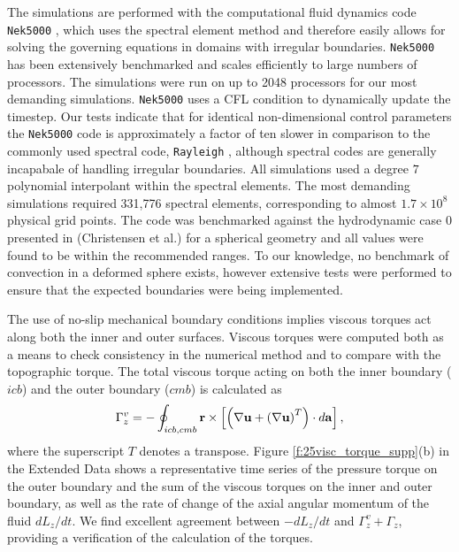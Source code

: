 The simulations are performed with the computational fluid dynamics code \texttt{Nek5000} \citep{nek5000}, which uses the spectral element method \citep{aP84} and therefore easily allows for solving the governing equations in domains with irregular boundaries. 
\texttt{Nek5000} has been extensively benchmarked and scales efficiently to large numbers of processors. 
The simulations were run on up to 2048 processors for our most demanding simulations. \texttt{Nek5000} uses a CFL condition to dynamically update the timestep. Our tests indicate that for identical non-dimensional control parameters the \texttt{Nek5000} code is approximately a factor of ten slower in comparison to the commonly used spectral code, \texttt{Rayleigh} \citep{hM16}, although spectral codes are generally incapabale of handling irregular boundaries.
All simulations used a degree $7$ polynomial interpolant within the spectral elements.
The most demanding simulations required 331,776 spectral elements, corresponding to almost $1.7\times10^8$ physical grid points. 
\textcolor{\revtxt}{The code was benchmarked against the hydrodynamic case 0 presented in (Christensen et al.) \citep{uC01} for a spherical geometry and all values were found to be within the recommended ranges. 
To our knowledge, no benchmark of convection in a deformed sphere exists, however extensive tests were performed to ensure that the expected boundaries were being implemented.}

\textcolor{\revtxt}{
The use of no-slip mechanical boundary conditions implies viscous torques act along both the inner and outer surfaces. Viscous torques were computed both as a means to check consistency in the numerical method and to compare with the topographic torque.
	The total viscous torque acting on both the inner boundary ($icb$) and the outer boundary ($cmb$) is calculated as
	\begin{equation}
	\Gamma_{z}^{v} = -\oint_{icb,cmb} \mathbf{r} \times \left[ \left (\nabla \mathbf{u} +\left (\nabla\mathbf{u}\right )^{T}\right ) \cdot d\mathbf{a}\right] ,
		\label{e:25vtq}
	\end{equation}
	where the superscript $T$ denotes a transpose. Figure \ref{f:25visc_torque_supp}(b) in the Extended Data shows a representative time series of the pressure torque on the outer boundary and the sum of the viscous torques on the inner and outer boundary, as well as the rate of change of the axial angular momentum of the fluid $dL_z/dt$. We find excellent agreement between $-dL_z/dt$ and $\Gamma_{z}^{v}+\Gamma_{z}$, providing a verification of the calculation of the torques.}
	


